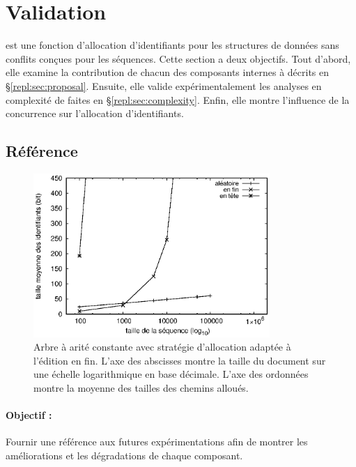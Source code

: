 
\section{Validation}
\label{repl:sec:validation}

\LSEQ est une fonction d'allocation d'identifiants pour les structures de
données sans conflits conçues pour les séquences.  Cette section a deux
objectifs. Tout d'abord, elle examine la contribution de chacun des composants
internes à \LSEQ décrits en §\ref{repl:sec:proposal}.  Ensuite, elle valide
expérimentalement les analyses en complexité de \LSEQ faites en
§\ref{repl:sec:complexity}.  Enfin, elle montre l'influence de la concurrence
sur l'allocation d'identifiants.


\subsection{Référence}

\begin{figure}
  \begin{center}
    \includegraphics[width=0.8\textwidth]{img/lseq/logoot.eps}
    \caption[Mesures de référence de la taille des chemins]
    {\label{repl:img:logoot} Arbre à arité constante avec stratégie d'allocation
      adaptée à l'édition en fin. L'axe des abscisses montre la taille du
      document sur une échelle logarithmique en base décimale. L'axe des
      ordonnées montre la moyenne des tailles des chemins alloués.}
  \end{center}
\end{figure}


\paragraph{Objectif :} Fournir une référence aux futures expérimentations afin
de montrer les améliorations et les dégradations de chaque composant.

